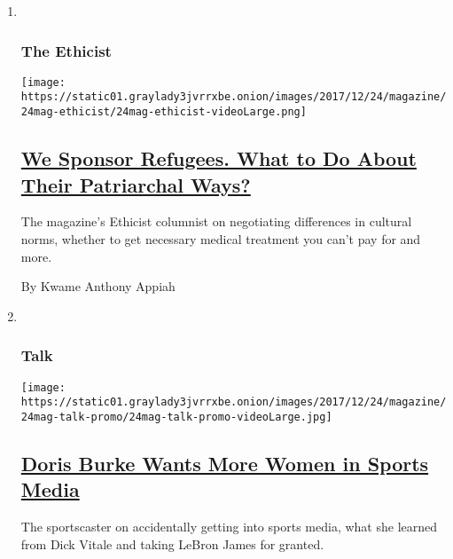\begin{enumerate}
\def\labelenumi{\arabic{enumi}.}
\item ~
  \hypertarget{the-ethicist}{%
  \subsubsection{The Ethicist}\label{the-ethicist}}

  \texttt{[image: https://static01.graylady3jvrrxbe.onion/images/2017/12/24/magazine/24mag-ethicist/24mag-ethicist-videoLarge.png]}

  \hypertarget{we-sponsor-refugees-what-to-do-about-their-patriarchal-ways}{%
  \subsection{\texorpdfstring{\href{/2017/12/20/magazine/we-sponsor-refugees-what-to-do-about-their-patriarchal-ways.html}{We
  Sponsor Refugees. What to Do About Their Patriarchal
  Ways?}}{We Sponsor Refugees. What to Do About Their Patriarchal Ways?}}\label{we-sponsor-refugees-what-to-do-about-their-patriarchal-ways}}

  The magazine's Ethicist columnist on negotiating differences in
  cultural norms, whether to get necessary medical treatment you can't
  pay for and more.

  By Kwame Anthony Appiah
\item ~
  \hypertarget{talk}{%
  \subsubsection{Talk}\label{talk}}

  \texttt{[image: https://static01.graylady3jvrrxbe.onion/images/2017/12/24/magazine/24mag-talk-promo/24mag-talk-promo-videoLarge.jpg]}

  \hypertarget{doris-burke-wants-more-women-in-sports-media}{%
  \subsection{\texorpdfstring{\href{/2017/12/20/magazine/doris-burke-wants-more-women-in-sports-media.html}{Doris
  Burke Wants More Women in Sports
  Media}}{Doris Burke Wants More Women in Sports Media}}\label{doris-burke-wants-more-women-in-sports-media}}

  The sportscaster on accidentally getting into sports media, what she
  learned from Dick Vitale and taking LeBron James for granted.


\end{enumerate}
